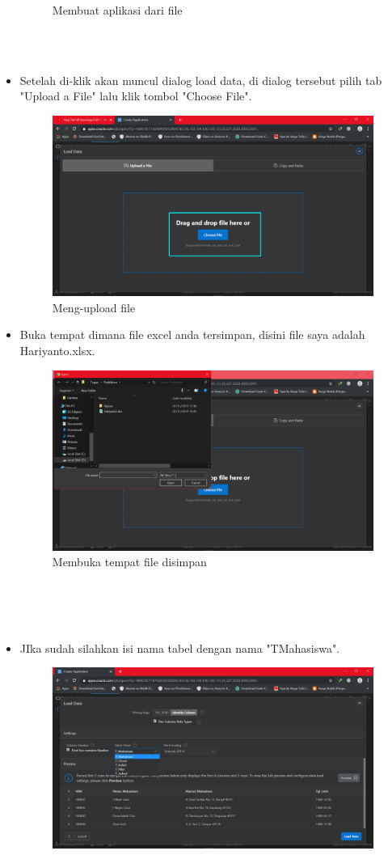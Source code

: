 \documentclass[12pt, times new roman]{article}
\begin{document}
\begin{itemize}
\begin{figure}[htbp]
	\caption{Membuat aplikasi dari file}
\end{figure}\\
\\
\item Setelah di-klik akan muncul dialog load data, di dialog tersebut pilih tab "Upload a File" lalu klik tombol "Choose File".
\begin{figure}[htbp]
	\centering
	\includegraphics[width=10.5cm]{figures/6.png}
	\caption{Meng-upload file}
\end{figure}
\item Buka tempat dimana file excel anda tersimpan, disini file saya adalah Hariyanto.xlsx.
\begin{figure}[htbp]
	\centering
	\includegraphics[width=10.5cm]{figures/Screenshot_5.png}
	\caption{Membuka tempat file disimpan}
\end{figure}\\
\\
\\
\item JIka sudah silahkan isi nama tabel dengan nama "TMahasiswa". 
\begin{figure}[htbp]
	\centering
	\includegraphics[width=10.5cm]{figures/Screenshot_6.png}

\end{figure}
\end{itemize}
\end{document}
